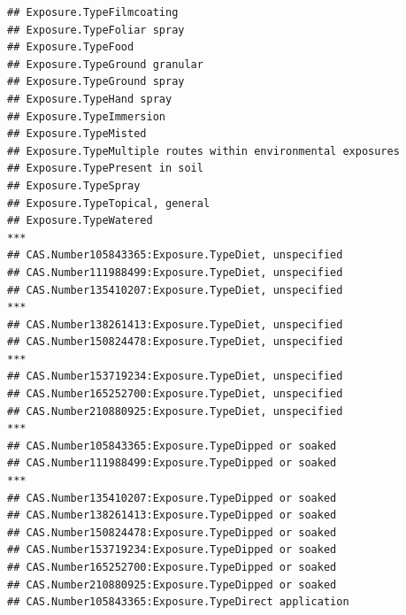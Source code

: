 \documentclass[
  12pt,
]{article}
\begin{document}
\begin{verbatim}
## Exposure.TypeFilmcoating                                                           
## Exposure.TypeFoliar spray                                                          
## Exposure.TypeFood                                                                  
## Exposure.TypeGround granular                                                       
## Exposure.TypeGround spray                                                          
## Exposure.TypeHand spray                                                            
## Exposure.TypeImmersion                                                             
## Exposure.TypeMisted                                                                
## Exposure.TypeMultiple routes within environmental exposures                        
## Exposure.TypePresent in soil                                                       
## Exposure.TypeSpray                                                                 
## Exposure.TypeTopical, general                                                      
## Exposure.TypeWatered                                                            ***
## CAS.Number105843365:Exposure.TypeDiet, unspecified                                 
## CAS.Number111988499:Exposure.TypeDiet, unspecified                                 
## CAS.Number135410207:Exposure.TypeDiet, unspecified                              ***
## CAS.Number138261413:Exposure.TypeDiet, unspecified                                 
## CAS.Number150824478:Exposure.TypeDiet, unspecified                              ***
## CAS.Number153719234:Exposure.TypeDiet, unspecified                                 
## CAS.Number165252700:Exposure.TypeDiet, unspecified                                 
## CAS.Number210880925:Exposure.TypeDiet, unspecified                              ***
## CAS.Number105843365:Exposure.TypeDipped or soaked                                  
## CAS.Number111988499:Exposure.TypeDipped or soaked                               ***
## CAS.Number135410207:Exposure.TypeDipped or soaked                                  
## CAS.Number138261413:Exposure.TypeDipped or soaked                                  
## CAS.Number150824478:Exposure.TypeDipped or soaked                                  
## CAS.Number153719234:Exposure.TypeDipped or soaked                                  
## CAS.Number165252700:Exposure.TypeDipped or soaked                                  
## CAS.Number210880925:Exposure.TypeDipped or soaked                                  
## CAS.Number105843365:Exposure.TypeDirect application                                

\end{verbatim}
\end{document}
